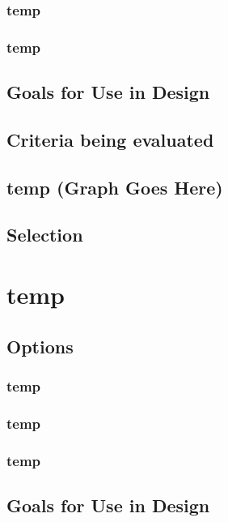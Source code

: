 \documentclass[10pt,letterpaper,onecolumn,journal]{IEEEtran}
\begin{document}
\subsubsection{temp}

\subsubsection{temp}

\subsection{Goals for Use in Design}

\subsection{Criteria being evaluated}

\subsection*{temp (Graph Goes Here)}

\subsection{Selection}

\section{temp}

\subsection{Options}
\subsubsection{temp}

\subsubsection{temp}

\subsubsection{temp}

\subsection{Goals for Use in Design}
\end{document}
